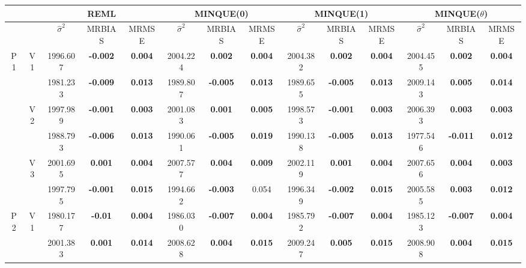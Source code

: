 \documentclass[11pt,a4paper]{article}
\begin{document}
{\scriptsize
\begin{sidewaystable}[H]
\centering
\captionsetup{width=20.5cm}
{\scriptsize
\begin{tabular}{cc|ccc|ccc|ccc|ccc|}
   & & \multicolumn{3}{c|}{REML}&\multicolumn{3}{c|}{MINQUE(0)}&\multicolumn{3}{c|}{MINQUE(1)}&\multicolumn{3}{c|}{MINQUE($\theta$)}\\ \hline
 &  & $\hat{\sigma}^2$ & MRBIAS & MRMSE & $\hat{\sigma}^2$ & MRBIAS & MRMSE & $\hat{\sigma}^2$ & MRBIAS & MRMSE & $\hat{\sigma}^2$ & MRBIAS & MRMSE \\ 
  \hline
\multirow{6}{*}{P1} & \multirow{2}{*}{V1} & 1996.607 & \textbf{-0.002} & \textbf{0.004} & 2004.224 & \textbf{0.002} & \textbf{0.004} & 2004.382 & \textbf{0.002} & \textbf{0.004} & 2004.455 & \textbf{0.002} & \textbf{0.004} \\ 
   &  & 1981.233 & \textbf{-0.009} & \textbf{0.013} & 1989.807 & \textbf{-0.005} & \textbf{0.013} & 1989.655 & \textbf{-0.005} & \textbf{0.013} & 2009.143 & \textbf{0.005} & \textbf{0.014} \\ 
   & \multirow{2}{*}{V2} & 1997.989 & \textbf{-0.001} & \textbf{0.003} & 2001.083 & \textbf{0.001} & \textbf{0.005} & 1998.573 & \textbf{-0.001} & \textbf{0.003} & 2006.393 & \textbf{0.003} & \textbf{0.003} \\ 
   &  & 1988.793 & \textbf{-0.006} & \textbf{0.013} & 1990.061 & \textbf{-0.005} & \textbf{0.019} & 1990.138 & \textbf{-0.005} & \textbf{0.013} & 1977.546 & \textbf{-0.011} & \textbf{0.012} \\ 
   & \multirow{2}{*}{V3} & 2001.695 & \textbf{0.001} & \textbf{0.004} & 2007.577 & \textbf{0.004} & \textbf{0.009} & 2002.119 & \textbf{0.001} & \textbf{0.004} & 2007.656 & \textbf{0.004} & \textbf{0.003} \\ 
   &  & 1997.795 & \textbf{-0.001} & \textbf{0.015} & 1994.662 & \textbf{-0.003} & 0.054 & 1996.349 & \textbf{-0.002} & \textbf{0.015} & 2005.585 & \textbf{0.003} & \textbf{0.012} \\ 
   \hline \hline\multirow{6}{*}{P2} & \multirow{2}{*}{V1} & 1980.177 & \textbf{-0.01} & \textbf{0.004} & 1986.030 & \textbf{-0.007} & \textbf{0.004} & 1985.792 & \textbf{-0.007} & \textbf{0.004} & 1985.123 & \textbf{-0.007} & \textbf{0.004} \\ 
   &  & 2001.383 & \textbf{0.001} & \textbf{0.014} & 2008.628 & \textbf{0.004} & \textbf{0.015} & 2009.247 & \textbf{0.005} & \textbf{0.015} & 2008.908 & \textbf{0.004} & \textbf{0.015} \\ 

\end{tabular}}
\end{sidewaystable}}
\end{document}
